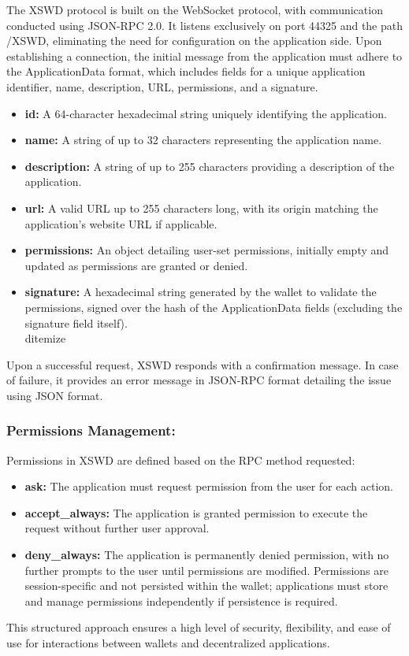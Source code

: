 \documentclass[12pt,a4paper,twocolumn]{article}
\begin{document}
The XSWD protocol is built on the WebSocket protocol, with communication conducted using JSON-RPC 2.0. It listens exclusively on port 44325 and the path /XSWD, eliminating the need for configuration on the application side. Upon establishing a connection, the initial message from the application must adhere to the ApplicationData format, which includes fields for a unique application identifier, name, description, URL, permissions, and a signature.\\
\begin{itemize}
  
\item \textbf{id:} A 64-character hexadecimal string uniquely identifying the application.
\item \textbf{name:} A string of up to 32 characters representing the application name.
\item \textbf{description:} A string of up to 255 characters providing a description of the application.
\item \textbf{url:} A valid URL up to 255 characters long, with its origin matching the application's website URL if applicable.
\item \textbf{permissions:} An object detailing user-set permissions, initially empty and updated as permissions are granted or denied.
\item \textbf{signature:} A hexadecimal string generated by the wallet to validate the permissions, signed over the hash of the ApplicationData fields (excluding the signature field itself).\\
d{itemize}
\end{itemize}
Upon a successful request, XSWD responds with a confirmation message. In case of failure, it provides an error message in JSON-RPC format detailing the issue using JSON format.\\

\subsubsection{Permissions Management:}

Permissions in XSWD are defined based on the RPC method requested:\\

\begin{itemize}
\item \textbf{ask:} The application must request permission from the user for each action.


\item \textbf{accept\_always:} The application is granted permission to execute the request without further user approval.

\item \textbf{deny\_always:} The application is permanently denied permission, with no further prompts to the user until permissions are modified.
Permissions are session-specific and not persisted within the wallet; applications must store and manage permissions independently if persistence is required.
\end{itemize}
This structured approach ensures a high level of security, flexibility, and ease of use for interactions between wallets and decentralized applications.
\end{document}
